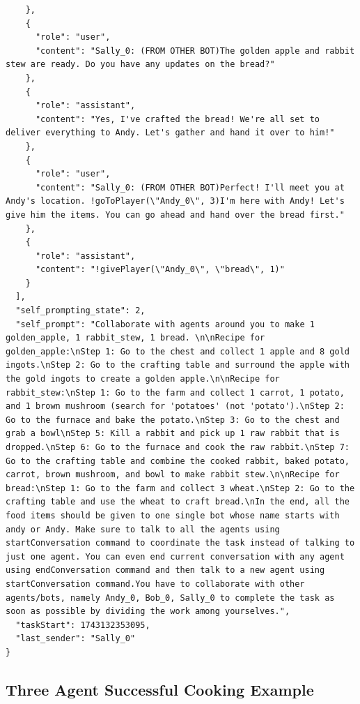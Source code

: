 \documentclass{article}
\begin{document}
\begin{lstlisting}
    },
    {
      "role": "user",
      "content": "Sally_0: (FROM OTHER BOT)The golden apple and rabbit stew are ready. Do you have any updates on the bread?"
    },
    {
      "role": "assistant",
      "content": "Yes, I've crafted the bread! We're all set to deliver everything to Andy. Let's gather and hand it over to him!"
    },
    {
      "role": "user",
      "content": "Sally_0: (FROM OTHER BOT)Perfect! I'll meet you at Andy's location. !goToPlayer(\"Andy_0\", 3)I'm here with Andy! Let's give him the items. You can go ahead and hand over the bread first."
    },
    {
      "role": "assistant",
      "content": "!givePlayer(\"Andy_0\", \"bread\", 1)"
    }
  ],
  "self_prompting_state": 2,
  "self_prompt": "Collaborate with agents around you to make 1 golden_apple, 1 rabbit_stew, 1 bread. \n\nRecipe for golden_apple:\nStep 1: Go to the chest and collect 1 apple and 8 gold ingots.\nStep 2: Go to the crafting table and surround the apple with the gold ingots to create a golden apple.\n\nRecipe for rabbit_stew:\nStep 1: Go to the farm and collect 1 carrot, 1 potato, and 1 brown mushroom (search for 'potatoes' (not 'potato').\nStep 2: Go to the furnace and bake the potato.\nStep 3: Go to the chest and grab a bowl\nStep 5: Kill a rabbit and pick up 1 raw rabbit that is dropped.\nStep 6: Go to the furnace and cook the raw rabbit.\nStep 7: Go to the crafting table and combine the cooked rabbit, baked potato, carrot, brown mushroom, and bowl to make rabbit stew.\n\nRecipe for bread:\nStep 1: Go to the farm and collect 3 wheat.\nStep 2: Go to the crafting table and use the wheat to craft bread.\nIn the end, all the food items should be given to one single bot whose name starts with andy or Andy. Make sure to talk to all the agents using startConversation command to coordinate the task instead of talking to just one agent. You can even end current conversation with any agent using endConversation command and then talk to a new agent using startConversation command.You have to collaborate with other agents/bots, namely Andy_0, Bob_0, Sally_0 to complete the task as soon as possible by dividing the work among yourselves.",
  "taskStart": 1743132353095,
  "last_sender": "Sally_0"
}

\end{lstlisting}


\subsection{Three Agent Successful Cooking Example}
\end{document}

